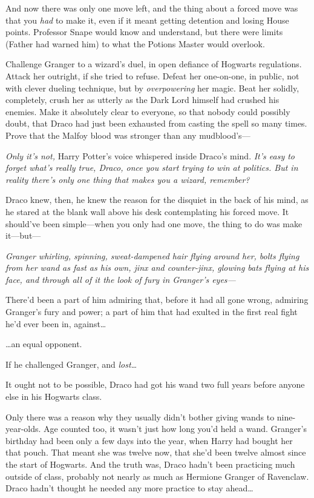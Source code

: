 And now there was only one move left, and the thing about a forced move was
that you \emph{had} to make it, even if it meant getting detention and losing
House points. Professor Snape would know and understand, but there were limits
(Father had warned him) to what the Potions Master would overlook.

Challenge Granger to a wizard's duel, in open defiance of Hogwarts regulations.
Attack her outright, if she tried to refuse. Defeat her one-on-one, in public,
not with clever dueling technique, but by \emph{overpowering} her magic. Beat
her solidly, completely, crush her as utterly as the Dark Lord himself had
crushed his enemies. Make it absolutely clear to everyone, so that nobody could
possibly doubt, that Draco had just been exhausted from casting the spell so
many times. Prove that the Malfoy blood was stronger than any mudblood's---

\emph{Only it's not,} Harry Potter's voice whispered inside Draco's mind.
\emph{It's easy to forget what's really true, Draco, once you start trying to
win at politics. But in reality there's only one thing that makes you a wizard,
remember?}

Draco knew, then, he knew the reason for the disquiet in the back of his mind,
as he stared at the blank wall above his desk contemplating his forced move. It
should've been simple---when you only had one move, the thing to do was make
it---but---

\emph{Granger whirling, spinning, sweat-dampened hair flying around her, bolts
flying from her wand as fast as his own, jinx and counter-jinx, glowing bats
flying at his face, and through all of it the look of fury in Granger's eyes---}

There'd been a part of him admiring that, before it had all gone wrong,
admiring Granger's fury and power; a part of him that had exulted in the first
real fight he'd ever been in, against{\ldots}

{\ldots}an equal opponent.

If he challenged Granger, and \emph{lost{\ldots}}

It ought not to be possible, Draco had got his wand two full years before
anyone else in his Hogwarts class.

Only there was a reason why they usually didn't bother giving wands to
nine-year-olds. Age counted too, it wasn't just how long you'd held a wand.
Granger's birthday had been only a few days into the year, when Harry had
bought her that pouch. That meant she was twelve now, that she'd been twelve
almost since the start of Hogwarts. And the truth was, Draco hadn't been
practicing much outside of class, probably not nearly as much as Hermione
Granger of Ravenclaw. Draco hadn't thought he needed any more practice to stay
ahead{\ldots}

